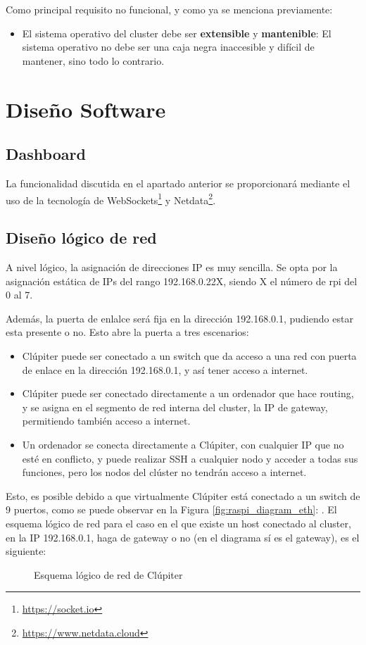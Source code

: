 Como principal requisito no funcional, y como ya se menciona previamente:
\begin{itemize}
    \item El sistema operativo del cluster debe ser \textbf{extensible} y \textbf{mantenible}: El sistema operativo no debe ser una caja negra inaccesible y difícil de mantener, sino todo lo contrario.
\end{itemize}

\section{Diseño Software}
\subsection{Dashboard}
La funcionalidad discutida en el apartado anterior se proporcionará mediante el uso de la tecnología de WebSockets\footnote{\url{https://socket.io}} y Netdata\footnote{\url{https://www.netdata.cloud}}.

\subsection{Diseño lógico de red}
A nivel lógico, la asignación de direcciones IP es muy sencilla. Se opta por la asignación estática de IPs del rango 192.168.0.22X, siendo X el número de \acrlong{rpi} del 0 al 7.

Además, la puerta de enlalce será fija en la dirección 192.168.0.1, pudiendo estar esta presente o no. Esto abre la puerta a tres escenarios:
\begin{itemize}
    \item Clúpiter puede ser conectado a un switch que da acceso a una red con puerta de enlace en la dirección 192.168.0.1, y así tener acceso a internet.
    \item Clúpiter puede ser conectado directamente a un ordenador que hace routing, y se asigna en el segmento de red interna del cluster, la IP de gateway, permitiendo también acceso a internet.
    \item Un ordenador se conecta directamente a Clúpiter, con cualquier IP que no esté en conflicto, y puede realizar SSH a cualquier nodo y acceder a todas sus funciones, pero los nodos del clúster no tendrán acceso a internet.
\end{itemize}

Esto, es posible debido a que virtualmente Clúpiter está conectado a un switch de 9 puertos, como se puede observar en la Figura \ref{fig:raspi_diagram_eth}: . El esquema lógico de red para el caso en el que existe un host conectado al cluster, en la IP 192.168.0.1, haga de gateway o no (en el diagrama sí es el gateway), es el siguiente:

\begin{figure}[H]
  \centering
  \vspace*{0.5cm}
  \def\svgwidth{\textwidth}
  
  \caption{Esquema lógico de red de Clúpiter}
  \label{fig:raspi_diagram_logical}
\end{figure}